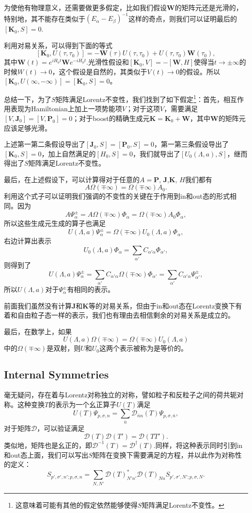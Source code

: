 为使他有物理意义，还需要做更多假定，比如我们假设$\bm{W}$的矩阵元还是光滑的，特别地，其不能存在类似于$(E_\alpha-E_\beta)^{-1}$这样的奇点，则我们可以证明最后的$[\bm{K}_0,S]=0$.

利用对易关系，可以得到下面的等式
\[
[\bm{K}_0,U(\tau,\tau_0)]=-\bm{W}(\tau)U(\tau,\tau_0)+U(\tau,\tau_0)\bm{W}(\tau_0),
\]
其中$\bm{W}(t)=e^{iH_0t}\bm{W}e^{-iH_0t}$.光滑性假设和$[\bm{K}_0,V]=-[\bm{W},H]$使得当$t\to \pm \infty$的时候$W(t)\to 0$，这个假设是自然的，其类似于$V(t)\to 0$的假设。所以$[\bm{K}_0,U(\infty,-\infty)]=[\bm{K}_0,S]=0$。

总结一下，为了$S$矩阵满足Lorentz不变性，我们找到了如下假定\footnote{这意味着可能有其他的假定依然能够使得$S$矩阵满足Lorentz不变性。}：首先，相互作用表现为Hamiltonian上加上一项势能项$V$；对于这项$V$，需要满足$[V,\bm{J}_0]=[V,\bm{P}_0]=0$；对于boost的精确生成元$\bm{K}=\bm{K}_0+\bm{W}$，其中$\bm{W}$的矩阵元应该足够光滑。

上述第一第二条假设导出了$[\bm{J}_0,S]=[\bm{P}_0,S]=0$，第一第三条假设导出了$[\bm{K}_0,S]=0$，加上自然满足的$[H_0,S]=0$，我们就导出了$[U_0(\Lambda,a),S]$，继而得出了$S$矩阵满足Lorentz不变性。

最后，在上述假设下，可以计算得对于任意的$A=\bm{P}$, $\bm{J}$,$ \bm{K}$, $H$我们都有
\[
A\Omega(\mp \infty)=\Omega(\mp \infty)A_0.
\]
利用这个式子可以证明我们强调的不变性的关键在于作用到in和out态的形式相同。因为
\[
A\Psi_\alpha^\pm=A\Omega(\mp \infty)\Phi_\alpha=\Omega(\mp \infty)A_0\Phi_\alpha,
\]
所以这些生成元生成的算子也满足
\[
U(\Lambda,a)\Psi_\alpha^\pm=\Omega(\mp \infty)U_0(\Lambda,a)\Phi_\alpha,
\]
右边计算出表示
\[
U_0(\Lambda,a)\Phi_\alpha=\sum_{\alpha'}C_{\alpha'\alpha}\Phi_{\alpha'},
\]
则得到了
\[
U(\Lambda,a)\Psi_\alpha^\pm=\sum_{\alpha'}C_{\alpha'\alpha}\Omega(\mp \infty)\Phi_{\alpha'}=\sum_{\alpha'}C_{\alpha'\alpha}\Psi^\pm_{\alpha'},
\]
所以$U(\Lambda,a)$对于$\Psi_\alpha^\pm$有相同的表示。

前面我们虽然没有计算$\bm{J}$和$\bm{K}$等的对易关系，但由于in和out态在Lorentz变换下有着和自由粒子态一样的表示，我们也有理由去相信剩余的对易关系是成立的。

最后，在数学上，如果
\[
	U(\Lambda,a)\Omega(\mp \infty)=\Omega(\mp \infty)U_0(\Lambda,a)
\]
中的$\Omega(\mp \infty)$是双射，则$U$和$U_0$这两个表示被称为是等价的。

\subsection*{Internal Symmetries}

毫无疑问，存在着与Lorentz对称独立的对称，譬如粒子和反粒子之间的荷共轭对称。这种变换$T$的表示为一个幺正算子$U(T)$满足
\[
U(T)\Psi_{p,\sigma,n}=\sum_{\bar{n}} \mathcal{D}_{\bar{n}n}(T)\Psi_{ p,\sigma,\bar{n}},
\]
对于矩阵$\mathcal{D}$，可以验证满足
\[
	\mathcal{D}(T)\mathcal{D}(T')=\mathcal{D}(TT').
\]
类似地，矩阵也是幺正的，即$\mathcal{D}^{-1}(T)=\mathcal{D}^\dag(T)$.同样，将这种表示同时引到in和out态上面，我们可以写出$S$矩阵在变换下需要满足的方程，并以此作为对称性的定义：
\[
	S_{p',\sigma',n';p,\sigma,n}=\sum_{N,N'}\mathcal{D}(T)^*_{N'n'}\mathcal{D}(T)_{Nn}S_{p',\sigma',N';p,\sigma,N}.
\]

